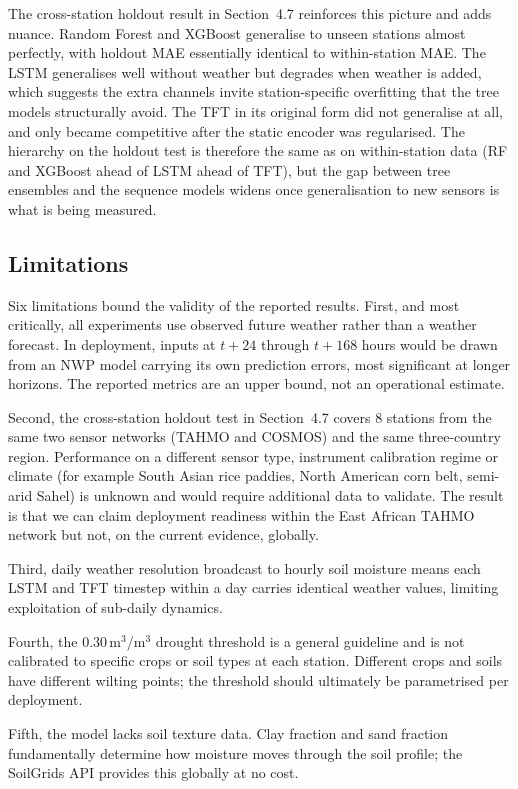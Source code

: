 \documentclass[12pt, a4paper]{article}
\begin{document}
The cross-station holdout result in Section~4.7 reinforces this picture and
adds nuance. Random Forest and XGBoost generalise to unseen stations almost
perfectly, with holdout MAE essentially identical to within-station MAE. The
LSTM generalises well without weather but degrades when weather is added,
which suggests the extra channels invite station-specific overfitting that the
tree models structurally avoid. The TFT in its original form did not generalise
at all, and only became competitive after the static encoder was regularised.
The hierarchy on the holdout test is therefore the same as on within-station
data (RF and XGBoost ahead of LSTM ahead of TFT), but the gap between tree
ensembles and the sequence models widens once generalisation to new sensors
is what is being measured.

\subsection{Limitations}

Six limitations bound the validity of the reported results. First, and most
critically, all experiments use observed future weather rather than a weather
forecast. In deployment, inputs at $t+24$ through $t+168$ hours would be drawn
from an NWP model carrying its own prediction errors, most significant at
longer horizons. The reported metrics are an upper bound, not an operational
estimate.

Second, the cross-station holdout test in Section~4.7 covers 8 stations from
the same two sensor networks (TAHMO and COSMOS) and the same three-country
region. Performance on a different sensor type, instrument calibration regime
or climate (for example South Asian rice paddies, North American corn belt,
semi-arid Sahel) is unknown and would require additional data to validate.
The result is that we can claim deployment readiness within the East African
TAHMO network but not, on the current evidence, globally.

Third, daily weather resolution broadcast to hourly soil moisture means each
LSTM and TFT timestep within a day carries identical weather values, limiting
exploitation of sub-daily dynamics.

Fourth, the 0.30\,m$^3$/m$^3$ drought threshold is a general guideline and is
not calibrated to specific crops or soil types at each station. Different
crops and soils have different wilting points; the threshold should ultimately
be parametrised per deployment.

Fifth, the model lacks soil texture data. Clay fraction and sand fraction
fundamentally determine how moisture moves through the soil profile; the
SoilGrids API provides this globally at no cost.
\end{document}
